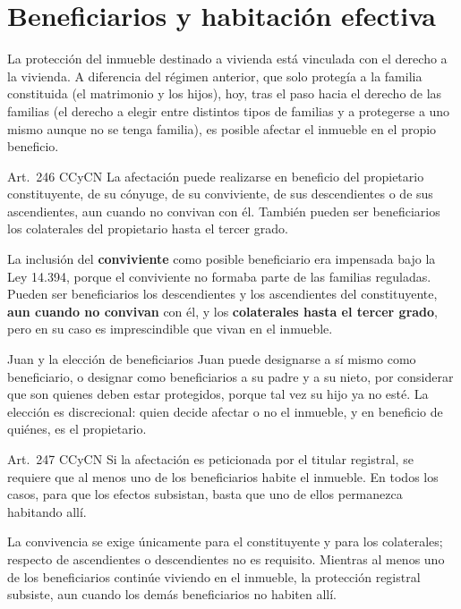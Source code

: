 \documentclass[12pt,oneside]{book}
\begin{document}
\section{Beneficiarios y habitación efectiva}

La protección del inmueble destinado a vivienda está vinculada con el derecho a la vivienda. A diferencia del régimen anterior, que solo protegía a la familia constituida (el matrimonio y los hijos), hoy, tras el paso hacia el derecho de las familias (el derecho a elegir entre distintos tipos de familias y a protegerse a uno mismo aunque no se tenga familia), es posible afectar el inmueble en el propio beneficio.

\begin{regla}{Art.~246 CCyCN}
La afectación puede realizarse en beneficio del propietario constituyente, de su cónyuge, de su conviviente, de sus descendientes o de sus ascendientes, aun cuando no convivan con él. También pueden ser beneficiarios los colaterales del propietario hasta el tercer grado.
\end{regla}

La inclusión del \textbf{conviviente} como posible beneficiario era impensada bajo la Ley 14.394, porque el conviviente no formaba parte de las familias reguladas. Pueden ser beneficiarios los descendientes y los ascendientes del constituyente, \textbf{aun cuando no convivan} con él, y los \textbf{colaterales hasta el tercer grado}, pero en su caso es imprescindible que vivan en el inmueble.

\begin{ejemplo}{Juan y la elección de beneficiarios}
Juan puede designarse a sí mismo como beneficiario, o designar como beneficiarios a su padre y a su nieto, por considerar que son quienes deben estar protegidos, porque tal vez su hijo ya no esté. La elección es discrecional: quien decide afectar o no el inmueble, y en beneficio de quiénes, es el propietario.
\end{ejemplo}

\begin{regla}{Art.~247 CCyCN}
Si la afectación es peticionada por el titular registral, se requiere que al menos uno de los beneficiarios habite el inmueble. En todos los casos, para que los efectos subsistan, basta que uno de ellos permanezca habitando allí.
\end{regla}

\begin{importante}
La convivencia se exige únicamente para el constituyente y para los colaterales; respecto de ascendientes o descendientes no es requisito. Mientras al menos uno de los beneficiarios continúe viviendo en el inmueble, la protección registral subsiste, aun cuando los demás beneficiarios no habiten allí.
\end{importante}
\end{document}

